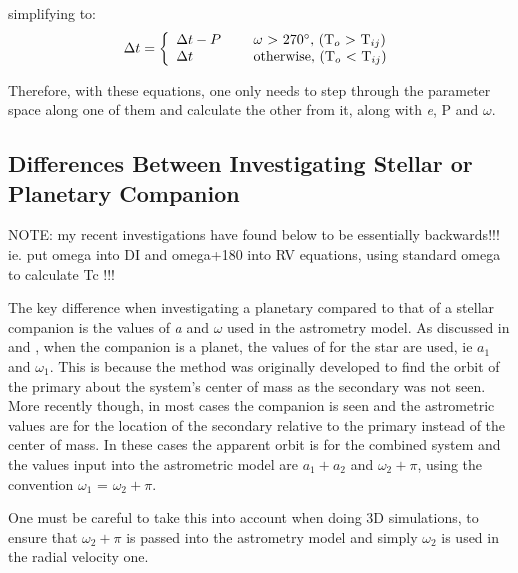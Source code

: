\documentclass[12pt,preprint]{aastex}
\begin{document}
simplifying to:
\begin{equation}\label{eq:ToTcCorrections2b}
\Delta t = \left\{ \begin{array}{l l} \Delta t-P& \quad \text{ $\omega$ $>$ 270$^{\circ}$, (T$_o$ $>$ T$_{ij}$)}\\  \Delta t& \quad \text{ otherwise, (T$_o$ $<$ T$_{ij}$)} \end{array} \right.
\end{equation}

Therefore, with these equations, one only needs to step through the parameter space along one of them and calculate the other from it, along with {\it e}, P and $\omega$.


\subsection{Differences Between Investigating Stellar or Planetary Companion}\label{sec:omegaIssues}

NOTE: my recent investigations have found below to be essentially backwards!!! ie. put omega into DI and omega+180 into RV equations, using standard omega to calculate Tc !!!

The key difference when investigating a planetary compared to that of a stellar companion is the values of {\it a} and $\omega$ used in the astrometry model.  As discussed in \citet{Shulze-Hartung} and \citet{wright2009}, when the companion is a planet, the values of for the star are used, ie $a_1$ and $\omega_1$.  This is because the method was originally developed to find the orbit of the primary about the system's center of mass as the secondary was not seen.  More recently though, in most cases the companion is seen and the astrometric values are for the location of the secondary relative to the primary instead of the center of mass.  In these cases the apparent orbit is for the combined system and the values input into the astrometric model are $a_1+a_2$ and $\omega_2+\pi$, using the convention $\omega_1$ = $\omega_2+\pi$.

One must be careful to take this into account when doing 3D simulations, to ensure that $\omega_2+\pi$ is passed into the astrometry model and simply $\omega_2$ is used in the radial velocity one.

\pagebreak

\end{document}
